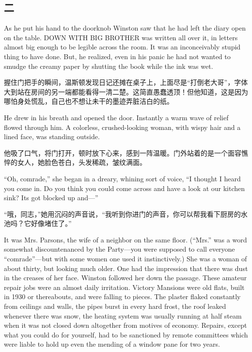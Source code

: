 \begin{paracol}{2}
\switchcolumn

\section*{二}\label{ux4e8c}

\switchcolumn*

As he put his hand to the doorknob Winston saw that he had left the
diary open on the table. DOWN WITH BIG BROTHER was written all over it,
in letters almost big enough to be legible across the room. It was an
inconceivably stupid thing to have done. But, he realized, even in his
panic he had not wanted to smudge the creamy paper by shutting the book
while the ink was wet.

\switchcolumn

握住门把手的瞬间，温斯顿发现日记还摊在桌子上，上面尽是``打倒老大哥''，字体大到站在房间的另一端都能看得一清二楚。这简直愚蠢透顶！但他知道，这是因为哪怕身处慌乱，自己也不想让未干的墨迹弄脏洁白的纸。

\switchcolumn*

He drew in his breath and opened the door. Instantly a warm wave of
relief flowed through him. A colorless, crushed-looking woman, with
wispy hair and a lined face, was standing outside.

\switchcolumn

他吸了口气，将门打开，顿时放下心来，感到一阵温暖。门外站着的是一个面容憔悴的女人，她脸色苍白，头发稀疏，皱纹满面。

\switchcolumn*

``Oh, comrade,'' she began in a dreary, whining sort of voice, ``I thought
I heard you come in. Do you think you could come across and have a look
at our kitchen sink? It\textquotesingle s got blocked up and---''

\switchcolumn

``哦，同志，''她用沉闷的声音说，``我听到你进门的声音，你可以帮我看下厨房的水池吗？它好像堵住了。''

\switchcolumn*

It was Mrs. Parsons, the wife of a neighbor on the same floor. (``Mrs.''
was a word somewhat discountenanced by the Party---you were supposed to
call everyone ``comrade''---but with some women one used it
instinctively.) She was a woman of about thirty, but looking much older.
One had the impression that there was dust in the creases of her face.
Winston followed her down the passage. These amateur repair jobs were an
almost daily irritation. Victory Mansions were old flats, built in 1930
or thereabouts, and were falling to pieces. The plaster flaked
constantly from ceilings and walls, the pipes burst in every hard frost,
the roof leaked whenever there was snow, the heating system was usually
running at half steam when it was not closed down altogether from
motives of economy. Repairs, except what you could do for yourself, had
to be sanctioned by remote committees which were liable to hold up even
the mending of a window pane for two years.


\end{paracol}
